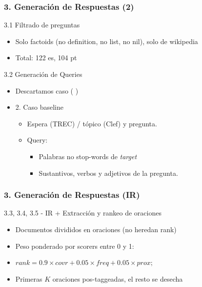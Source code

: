 \begin{frame}
\frametitle{3. Generación de Respuestas (2)}
   \begin{block}{3.1 Filtrado de preguntas}
  \begin{itemize}
      \item Solo factoids (no definition, no list, no nil), solo de wikipedia
      \item Total: 122 es, 104 pt
    \end{itemize}
  \end{block}
  \begin{block}{3.2 Generación de Queries}
  \begin{itemize}
      \item Descartamos caso ( )
      \item 2. Caso baseline
      \begin{itemize}
        \item Espera (TREC) / tópico (Clef) y pregunta. 
        \item Query:
        \begin{itemize}
              \item  Palabras no stop-words de \textit{target} 
              \item  Sustantivos, verbos y adjetivos de la pregunta.
        \end{itemize}
      \end{itemize}
    \end{itemize}
  \end{block}
\end{frame}


\begin{frame}
\frametitle{3. Generación de Respuestas (IR)}
  \begin{block}{3.3, 3.4, 3.5 - IR + Extracción y rankeo de oraciones}
    \begin{itemize}
      \item Documentos divididos en oraciones (no heredan rank)
      \item Peso ponderado por scorers entre 0 y 1:
      \item $rank = 0.9\times covr + 0.05\times freq + 0.05\times prox;$
      \item Primeras $K$ oraciones pos-taggeadas, el resto se desecha
    \end{itemize}
  \end{block}
\end{frame}

